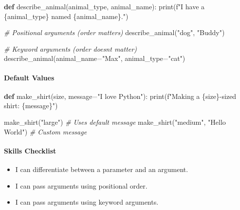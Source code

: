 \documentclass[
  justified,
  openright,
]{tufte-book}
\let\subsection\paragraph
\let\paragraph\paragraph
\newcommand{\KeywordTok}[1]{\textcolor{CodeKeyword}{\textbf{#1}}}  %
\newcommand{\StringTok}[1]{\textcolor{CodeString}{#1}}              %
\newcommand{\CommentTok}[1]{\textcolor{CodeComment}{\textit{#1}}}  %
\newcommand{\OperatorTok}[1]{\textcolor{DarkGray}{#1}}              %
\newenvironment{Shaded}{%
  \begin{mdframed}[style=TufteCode]%
}{%
  \end{mdframed}%
}
\let\subsection\paragraph
\let\paragraph\paragraph
\providecommand{\tightlist}{%
  \setlength{\itemsep}{0pt}\setlength{\parskip}{0pt}}
\begin{document}
\begin{Shaded}
\begin{Highlighting}[]
\KeywordTok{def} describe\_animal(animal\_type, animal\_name):
    print(\StringTok{f"I have a }\StringTok{\{}animal\_type\StringTok{\}}\StringTok{ named }\StringTok{\{}animal\_name\StringTok{\}}\StringTok{."})
 
\CommentTok{\# Positional arguments (order matters)}
describe\_animal(\StringTok{"dog"}, \StringTok{"Buddy"})
 
\CommentTok{\# Keyword arguments (order doesn\textquotesingle{}t matter)}
describe\_animal(animal\_name\OperatorTok{=}\StringTok{"Max"}, animal\_type\OperatorTok{=}\StringTok{"cat"})
\end{Highlighting}
\end{Shaded}

\subsection{Default Values}\label{default-values}

\begin{Shaded}
\begin{Highlighting}[]
\KeywordTok{def} make\_shirt(size, message\OperatorTok{=}\StringTok{"I love Python"}):
    print(\StringTok{f"Making a }\StringTok{\{}size\StringTok{\}}\StringTok{{-}sized shirt: \textquotesingle{}}\StringTok{\{}message\StringTok{\}}\StringTok{\textquotesingle{}"})
 
make\_shirt(\StringTok{"large"})                       \CommentTok{\# Uses default message}
make\_shirt(\StringTok{"medium"}, \StringTok{"Hello World"})       \CommentTok{\# Custom message}
\end{Highlighting}
\end{Shaded}

\subsection{Skills Checklist}\label{skills-checklist-28}

\begin{itemize}
\tightlist
\item[$\square$]
  I can differentiate between a parameter and an argument.
\item[$\square$]
  I can pass arguments using positional order.
\item[$\square$]
  I can pass arguments using keyword arguments.
\end{itemize}
\end{document}
